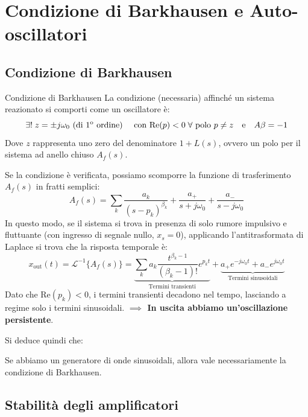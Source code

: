 \section{Condizione di Barkhausen e Auto-oscillatori}

\subsection{Condizione di Barkhausen}
\label{sec:barkhausen}

\begin{definizione}{Condizione di Barkhausen}
La condizione (necessaria) affinché un sistema reazionato si comporti come un oscillatore è:
\[
\exists ! \; z = \pm j\omega_0 \text{ (di 1\textsuperscript{o} ordine) } \quad \text{con } \text{Re}(p) < 0 \; \forall \text{ polo } p \neq z \quad \text{e} \quad A\beta = -1
\]
Dove $z$ rappresenta uno zero del denominatore $1+L(s)$, ovvero un polo per il sistema ad anello chiuso $A_f(s)$.
\end{definizione}

Se la condizione è verificata, possiamo scomporre la funzione di trasferimento $A_f(s)$ in fratti semplici:
\[
A_f(s) = \sum_k \frac{a_k}{(s-p_k)^{\beta_k}} + \frac{a_+}{s+j\omega_0} + \frac{a_-}{s-j\omega_0}
\]
In questo modo, se il sistema si trova in presenza di solo rumore impulsivo e fluttuante (con ingresso di segnale nullo, $x_s = 0$), applicando l'antitrasformata di Laplace si trova che la risposta temporale è:
\[
x_{\text{out}}(t) = \mathcal{L}^{-1}\{A_f(s)\} = \underbrace{\sum_k a_k \frac{t^{\beta_k-1}}{(\beta_k-1)!} e^{p_k t}}_{\text{Termini transienti}} + \underbrace{a_+ e^{-j\omega_0 t} + a_- e^{j\omega_0 t}}_{\text{Termini sinusoidali}}
\]
Dato che $\text{Re}(p_k) < 0$, i termini transienti decadono nel tempo, lasciando a regime solo i termini sinusoidali.
\textbf{$\implies$ In uscita abbiamo un'oscillazione persistente}.

Si deduce quindi che:
\begin{important}
Se abbiamo un generatore di onde sinusoidali, allora vale necessariamente la condizione di Barkhausen.
\end{important}


\subsection{Stabilità degli amplificatori}

